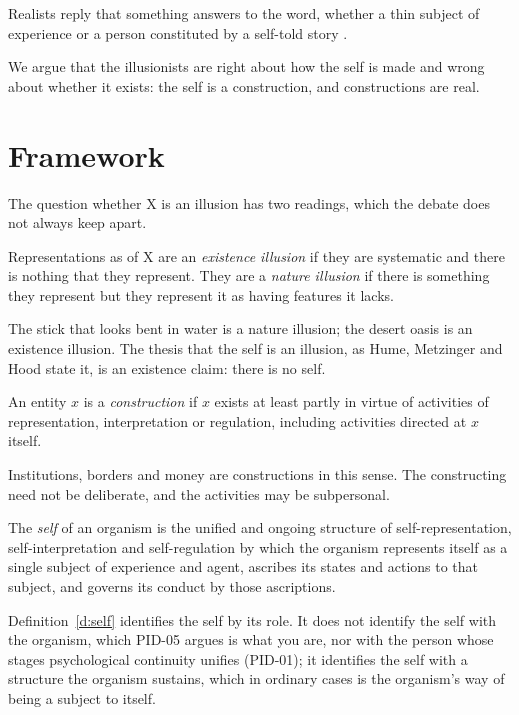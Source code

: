 \documentclass{situationist-preprint}
\begin{document}
Realists reply that something answers to the word, whether a thin subject of experience \citep{GStrawson1997} or a person constituted by a self-told story \citep{Schechtman1996}.

We argue that the illusionists are right about how the self is made and wrong about whether it exists: the self is a construction, and constructions are real.

\section{Framework}\label{s:frame}

The question whether X is an illusion has two readings, which the debate does not always keep apart.

\begin{definition}\label{d:illusion}
Representations as of X are an \emph{existence illusion} if they are systematic and there is nothing that they represent. They are a \emph{nature illusion} if there is something they represent but they represent it as having features it lacks.
\end{definition}

The stick that looks bent in water is a nature illusion; the desert oasis is an existence illusion. The thesis that the self is an illusion, as Hume, Metzinger and Hood state it, is an existence claim: there is no self.

\begin{definition}[Construction]\label{d:construction}
An entity $x$ is a \emph{construction} if $x$ exists at least partly in virtue of activities of representation, interpretation or regulation, including activities directed at $x$ itself.
\end{definition}

Institutions, borders and money are constructions in this sense. The constructing need not be deliberate, and the activities may be subpersonal.

\begin{definition}\label{d:self}
The \emph{self} of an organism is the unified and ongoing structure of self-representation, self-interpretation and self-regulation by which the organism represents itself as a single subject of experience and agent, ascribes its states and actions to that subject, and governs its conduct by those ascriptions.
\end{definition}

Definition~\ref{d:self} identifies the self by its role. It does not identify the self with the organism, which PID-05 argues is what you are, nor with the person whose stages psychological continuity unifies (PID-01); it identifies the self with a structure the organism sustains, which in ordinary cases is the organism's way of being a subject to itself.
\end{document}
